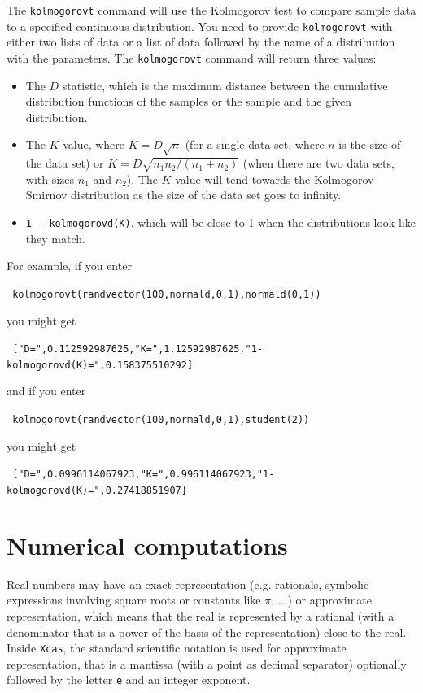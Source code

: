 \documentclass[a4paper,11pt]{book}
\begin{document}
The \texttt{kolmogorovt} command will use the Kolmogorov test to compare
sample data to a specified continuous distribution.
You need to provide \texttt{kolmogorovt} with either two lists of data
or a list of data followed by the name of a distribution with the
parameters.
The \texttt{kolmogorovt} command will return three values:
\begin{itemize}
  \item The $D$ statistic, which is the maximum distance between the
  cumulative distribution functions of the samples or the sample and
  the given distribution.
  \item The $K$ value, where $K = D\sqrt{n}$ (for a single data set,
  where $n$ is the size of the data set) or $K=D\sqrt{n_1 n_2 /(n_1 +
  n_2)}$ (when there are two data sets, with sizes $n_1$ and $n_2$).
  The $K$ value will tend towards the Kolmogorov-Smirnov distribution
  as the size of the data set goes to infinity.
  \item \texttt{1 - kolmogorovd(K)}, which will be close to 1 when the
  distributions look like they match.
\end{itemize}
For example, if you enter
\begin{center}
  \tt
  kolmogorovt(randvector(100,normald,0,1),normald(0,1))
\end{center}
you might get
\begin{center}
  \tt
  ["D=",0.112592987625,"K=",1.12592987625,"1-kolmogorovd(K)=",0.158375510292]
\end{center}
and if you enter
\begin{center}
  \tt
  kolmogorovt(randvector(100,normald,0,1),student(2))
\end{center}
you might get
\begin{center}
  \tt
  ["D=",0.0996114067923,"K=",0.996114067923,"1-kolmogorovd(K)=",0.27418851907]
\end{center}

\chapter{Numerical computations}\label{sec:numeric}
Real numbers may have an exact representation
(e.g. rationals, symbolic expressions
involving square roots or constants like $\pi$, ...)
or approximate representation, which means that the real
is represented by a rational (with a denominator that is a power
of the basis of the representation) close to the real.
Inside {\tt Xcas}, the standard scientific notation is used
for approximate representation, that is a mantissa (with a point
as decimal separator) optionally followed by the letter {\tt e}
and an integer exponent.
\end{document}
